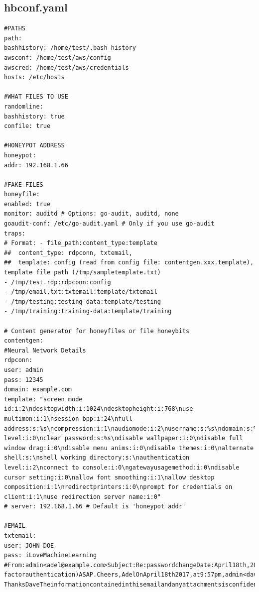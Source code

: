 \documentclass[grad,lot,lof,11pt,oneside,onehalfspace]{RUthesis}
\begin{document}
\subsection{hbconf.yaml}
\begin{lstlisting}
#PATHS
path:
bashhistory: /home/test/.bash_history
awsconf: /home/test/aws/config
awscred: /home/test/aws/credentials
hosts: /etc/hosts

#WHAT FILES TO USE
randomline:
bashhistory: true
confile: true

#HONEYPOT ADDRESS
honeypot:
addr: 192.168.1.66

#FAKE FILES
honeyfile:
enabled: true
monitor: auditd # Options: go-audit, auditd, none
goaudit-conf: /etc/go-audit.yaml # Only if you use go-audit
traps:
# Format: - file_path:content_type:template
##  content_type: rdpconn, txtemail,
##  template: config (read from config file: contentgen.xxx.template), template file path (/tmp/sampletemplate.txt)
- /tmp/test.rdp:rdpconn:config
- /tmp/email.txt:txtemail:template/txtemail
- /tmp/testing:testing-data:template/testing
- /tmp/training:training-data:template/training 

# Content generator for honeyfiles or file honeybits
contentgen:
#Neural Network Details
rdpconn:
user: admin
pass: 12345
domain: example.com
template: "screen mode id:i:2\ndesktopwidth:i:1024\ndesktopheight:i:768\nuse multimon:i:1\nsession bpp:i:24\nfull address:s:%s\ncompression:i:1\naudiomode:i:2\nusername:s:%s\ndomain:s:%s\nauthentication level:i:0\nclear password:s:%s\ndisable wallpaper:i:0\ndisable full window drag:i:0\ndisable menu anims:i:0\ndisable themes:i:0\nalternate shell:s:\nshell working directory:s:\nauthentication level:i:2\nconnect to console:i:0\ngatewayusagemethod:i:0\ndisable cursor setting:i:0\nallow font smoothing:i:1\nallow desktop composition:i:1\nredirectprinters:i:0\nprompt for credentials on client:i:1\nuse redirection server name:i:0"
# server: 192.168.1.66 # Default is 'honeypot addr'

#EMAIL
txtemail:
user: JOHN DOE
pass: iLoveMachineLearning
#From:admin<adel@example.com>Subject:Re:passwordchangeDate:April18th,2017at21:59:15GMT+11To:JOHNDOE<dave.cohen@example.com>Cc:security<security@example.com>Hi,Ah,sorryIforgottosendyouthenewaddress:http://%sIalsoresetyourpassword(user:%s)tothedefaultpass:%sPleasesettheMFA(multi-factorauthentication)ASAP.Cheers,AdelOnApril18th2017,at9:57pm,admin<dave.cohen@example.com>wrote:Hiadmin,IjustwantedtologintotheMonitoringsystem,butIget404error.Couldyoupleasehavealookatit?ThanksDaveTheinformationcontainedinthisemailandanyattachmentsisconfidentialand/orprivileged.Thisemailandanyattachmentsareintendedtobereadonlybythepersonnamedabove.Ifthereaderofthisemail,andanyattachments,isnottheintendedrecipient,youareherebynotifiedthatanyreview,disseminationorcopyingofthisemailandanyattachmentsisprohibited.Ifyouhavereceivedthisemailandanyattachmentsinerror,pleasenotifythesenderbyemailortelephoneanddeleteitfromyouremailclient.


\end{lstlisting}
\end{document}
